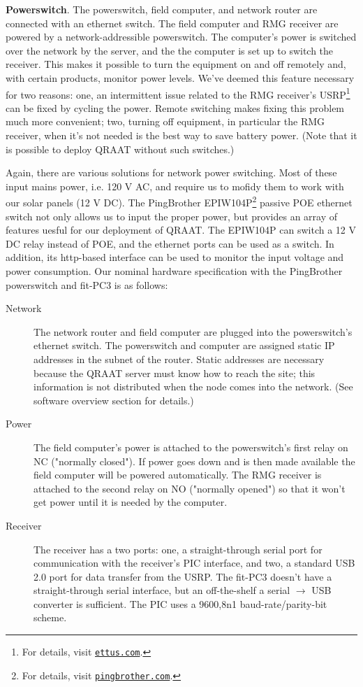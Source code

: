 \documentclass[letter]{article}
\newcounter{foot}
\begin{document}
\textbf{Powerswitch}. The powerswitch, field computer,
and network router are connected with an ethernet switch. The field computer and RMG 
receiver are powered by a network-addressible powerswitch. The computer's power is 
switched over the network by the server, and the the computer is set up to switch the receiver. 
This makes it possible to turn the equipment on and off remotely and, with certain products, 
monitor power levels. We've deemed this feature necessary for two reasons: one, an intermittent 
issue related to the RMG receiver's USRP\footnote{For details, visit
\href{https://www.ettus.com}{\tt ettus.com}.} can be fixed by cycling the power. Remote 
switching makes fixing this problem much more convenient; two, turning off equipment, 
in particular the RMG receiver, when it's not needed is the best way to save battery power.
(Note that it is possible to deploy QRAAT without such switches.) 

Again, there are various solutions for network power switching. Most of these input 
mains power, i.e. 120 V AC, and require us to mofidy them to work with our solar 
panels (12 V DC). The PingBrother EPIW104P\footnote{For details, visit
\href{http://www.pingbrother.com}{\tt pingbrother.com}.} passive POE ethernet switch 
not only allows us to input the proper power, but provides an array of features 
uesful for our deployment of QRAAT. The EPIW104P can switch a 12 V DC relay instead of
POE, and the ethernet ports can be used as a switch. In addition, its http-based 
interface can be used to monitor the input voltage and power consumption. Our nominal 
hardware specification with the PingBrother powerswitch and fit-PC3 is as follows: 

\begin{description}
  \item[\quad Network] The network router and field computer are plugged into the 
    powerswitch's ethernet switch. The powerswitch and computer are assigned static
    IP addresses in the subnet of the router. Static addresses are necessary because 
    the QRAAT server must know how to reach the site; this information is not 
    distributed when the node comes into the network. (See software overview section 
    for details.) 
    
  \item[\quad Power] The field computer's power is attached to the powerswitch's 
    first relay on NC ("normally closed"). If power goes down and is then made 
    available the field computer will be powered automatically. The RMG receiver is
    attached to the second relay on NO ("normally opened") so that it won't get power 
    until it is needed by the computer. 
    
  \item[\quad Receiver] The receiver has a two ports: one, a straight-through serial 
    port for communication with the receiver's PIC interface, and two, a standard USB
    2.0 port for data transfer from the USRP. The fit-PC3 doesn't have a straight-through
    serial interface, but an off-the-shelf a serial $\rightarrow$ USB converter is 
    sufficient. The PIC uses a 9600,8n1 baud-rate/parity-bit scheme.  
\end{description}
 
\end{document}

